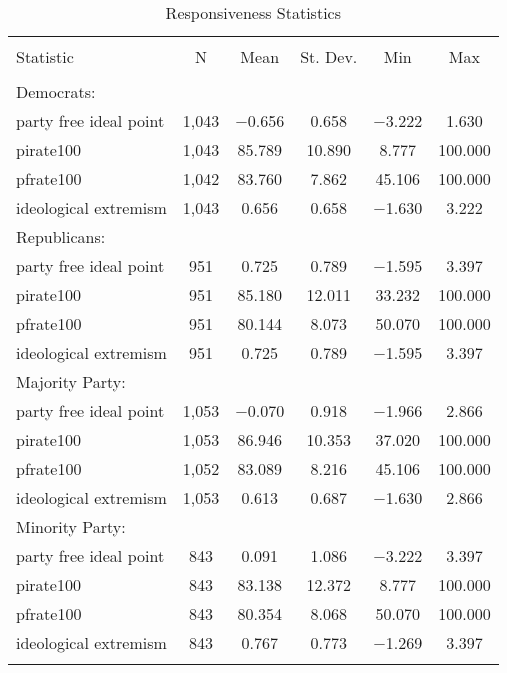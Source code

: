 \documentclass[12pt]{article}
\begin{document}
\begin{table}[!htbp] \centering 
	\caption{Responsiveness Statistics} 
	\label{} 
	\begin{tabular}{@{\extracolsep{5pt}}lccccc} 
		\\[-1.8ex]\hline 
		\hline \\[-1.8ex] 
		Statistic & \multicolumn{1}{c}{N} & \multicolumn{1}{c}{Mean} & \multicolumn{1}{c}{St. Dev.} & \multicolumn{1}{c}{Min} & \multicolumn{1}{c}{Max} \\ 
		\hline \\[-1.8ex] 
		Democrats: & & & & & \\
		\hline
		party free ideal point & 1,043 & $-$0.656 & 0.658 & $-$3.222 & 1.630 \\ 
		pirate100 & 1,043 & 85.789 & 10.890 & 8.777 & 100.000 \\ 
		pfrate100 & 1,042 & 83.760 & 7.862 & 45.106 & 100.000 \\ 
		ideological extremism & 1,043 & 0.656 & 0.658 & $-$1.630 & 3.222 \\ 
		\hline
		Republicans: & & & & & \\
		\hline
		party free ideal point & 951 & 0.725 & 0.789 & $-$1.595 & 3.397 \\ 
		pirate100 & 951 & 85.180 & 12.011 & 33.232 & 100.000 \\ 
		pfrate100 & 951 & 80.144 & 8.073 & 50.070 & 100.000 \\ 
		ideological extremism & 951 & 0.725 & 0.789 & $-$1.595 & 3.397 \\ 
		\hline
		Majority Party: & & & & & \\
		\hline
		party free ideal point & 1,053 & $-$0.070 & 0.918 & $-$1.966 & 2.866 \\ 
		pirate100 & 1,053 & 86.946 & 10.353 & 37.020 & 100.000 \\ 
		pfrate100 & 1,052 & 83.089 & 8.216 & 45.106 & 100.000 \\ 
		ideological extremism & 1,053 & 0.613 & 0.687 & $-$1.630 & 2.866 \\ 
		\hline
		Minority Party: & & & & & \\
		\hline
		party free ideal point & 843 & 0.091 & 1.086 & $-$3.222 & 3.397 \\ 
		pirate100 & 843 & 83.138 & 12.372 & 8.777 & 100.000 \\ 
		pfrate100 & 843 & 80.354 & 8.068 & 50.070 & 100.000 \\ 
		ideological extremism & 843 & 0.767 & 0.773 & $-$1.269 & 3.397 \\ 
		\hline \\[-1.8ex] 
	\end{tabular} 
\end{table} 
\end{document}
